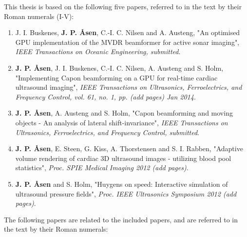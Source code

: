 \documentclass[10pt,b5paper,twoside]{book}
\newcommand\todo[1]{{\textit{\color{red}(#1)}}}
\begin{document}
This thesis is based on the following five papers, referred to in the text by their Roman numerals (I-V): 
\begin{enumerate}[I]
\renewcommand\labelenumi{\bfseries\theenumi}
	\item J. I. Buskenes, \textbf{J. P. \AA{}sen}, C.-I. C. Nilsen and A. Austeng, "An optimised GPU implementation of the MVDR beamformer for active sonar imaging", {\it  IEEE Transactions on Oceanic Engineering, submitted}.
	\item \textbf{J. P. \AA{}sen}, J. I. Buskenes, C.-I. C. Nilsen, A. Austeng and S. Holm, "Implementing Capon beamforming on a GPU for real-time cardiac ultrasound imaging", {\it IEEE Transactions on Ultrasonics, Ferroelectrics, and Frequency Control, vol. 61, no. 1, pp. \todo{add pages} Jan 2014}.
 	\item \textbf{J. P. \AA{}sen}, A. Austeng and S. Holm, "Capon beamforming and moving objects - An analysis of lateral shift-invariance", {\it IEEE Transactions on Ultrasonics, Ferroelectrics, and Frequency Control, submitted}.
	\item \textbf{J. P. \AA{}sen}, E. Steen, G. Kiss, A. Thorstensen and S. I. Rabben, "Adaptive volume rendering of cardiac 3D ultrasound images - utilizing blood pool statistics", {\it Proc. SPIE Medical Imaging 2012 \todo{add pages}}.
	\item \textbf{J. P. \AA{}sen} and S. Holm, "Huygens on speed: Interactive simulation of ultrasound pressure fields", {\it Proc. IEEE Ultrasonics Symposium 2012 \todo{add pages}}.
\end{enumerate}  

The following papers are related to the included papers, and are referred to in the text by their Roman numerals: 
\end{document}

